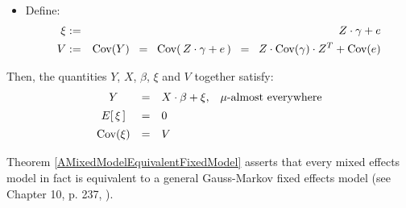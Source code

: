 \begin{theorem}
\begin{itemize}
\begin{equation*}
\begin{array}{ccll}
	\end{array}
	\end{equation*}
\item
	Define:
	\begin{eqnarray*}
	\xi & := & Z \cdot \gamma + e
	\\
	V & := & \textnormal{Cov}(Y) \;\; = \;\; \textnormal{Cov}\!\left(\,Z\cdot\gamma+e\,\right) \;\; = \;\; Z \cdot \textnormal{Cov}(\gamma) \cdot Z^{T} + \textnormal{Cov}(e)
	\end{eqnarray*}
\end{itemize}
Then, the quantities $Y$, $X$, $\beta$, $\xi$ and $V$ together satisfy:
	\begin{equation*}
	\begin{array}{ccll}
	Y & = & X \cdot \beta + \xi, & \textnormal{$\mu$-almost everywhere}
	\\
	E\!\left[\,\xi\,\right] &\overset{{\color{white}\vert}}{=}& 0
	\\
	\Cov\!\left(\xi\right) &\overset{{\color{white}\vert}}{=}& V
	\end{array}
	\end{equation*}
\end{theorem}


\begin{remark}
\mbox{}\vskip 0.0cm \noindent
Theorem \ref{AMixedModelEquivalentFixedModel} asserts that every mixed effects model
in fact is equivalent to a {\color{red}general Gauss-Markov} fixed effects model
(see Chapter 10, p. 237, \cite{Christensen2011}).
\end{remark}


\renewcommand{\theenumi}{\roman{enumi}}
\renewcommand{\labelenumi}{\textnormal{(\theenumi)}$\;\;$}

